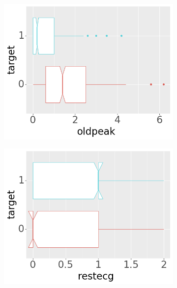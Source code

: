 \begin{figure}[b]
     \begin{subfigure}[b]{0.32\textwidth}
         \centering
         \includegraphics[width=\textwidth]{plots/target-oldpeak}
     \end{subfigure}
     \begin{subfigure}[b]{0.32\textwidth}
         \centering
         \includegraphics[width=\textwidth]{plots/target-restecg}
     \end{subfigure}
     \begin{subfigure}[b]{0.32\textwidth}
         \centering

\end{subfigure}
\end{figure}
